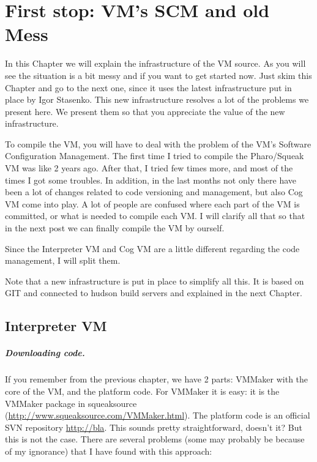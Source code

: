 \documentclass[a4paper,10pt,twoside]{book}
\begin{document}
\fi
\sloppy


\chapter{First stop: VM's SCM and old Mess}

In this Chapter we will explain the infrastructure of the VM source. As you will see the situation is a bit messy and if you want to get started now. Just skim this Chapter and go to the next one, since it uses the latest infrastructure put in place by Igor Stasenko. This new infrastructure resolves a lot of the problems we present here. We present them so that you appreciate the value of the new infrastructure. 


To compile the VM, you will have to deal with the problem of the VM's Software Configuration Management. The first time I tried to compile the Pharo/Squeak VM was like 2 years ago. After that, I tried few times more, and most of the times I got some troubles. In addition, in the last months not only there have been a lot of changes related to code versioning and management, but also Cog VM come into play. A lot of people are confused where each part of the VM is committed, or what is needed to compile each VM. I will clarify all that so that in the next post we can finally compile the VM by ourself.

Since the Interpreter VM and Cog VM are a little different regarding the code management, I will split them.

Note that a new infrastructure is put in place to simplify all this. It is based on GIT and connected to hudson build servers and explained in the next Chapter.

\section{Interpreter VM}

\paragraph{Downloading code.}
If you remember from the previous chapter, we have 2 parts: VMMaker with the core of the VM, and the platform code. For VMMaker it is easy: it is the VMMaker package in squeaksource (\url{http://www.squeaksource.com/VMMaker.html}). The platform code is an official SVN repository \url{http://bla}. This sounds pretty straightforward, doesn't it?  But this is not the case. There are several problems (some may probably be because of my ignorance) that I have found with this approach:
\end{document}
